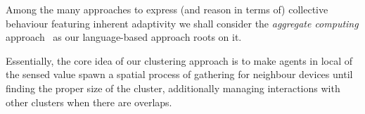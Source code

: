 Among the many approaches to express (and reason in terms of) collective behaviour featuring inherent adaptivity we shall consider the \emph{aggregate computing} approach~\cite{DBLP:journals/jlap/ViroliBDACP19} as our language-based approach roots on it.
%
%
%
%
%

Essentially, the core idea of our clustering approach is to make agents
 in local  of the sensed value  spawn a spatial process of gathering for neighbour devices until finding the proper size of the cluster,
 additionally managing interactions with other clusters when there are overlaps.
%
%

